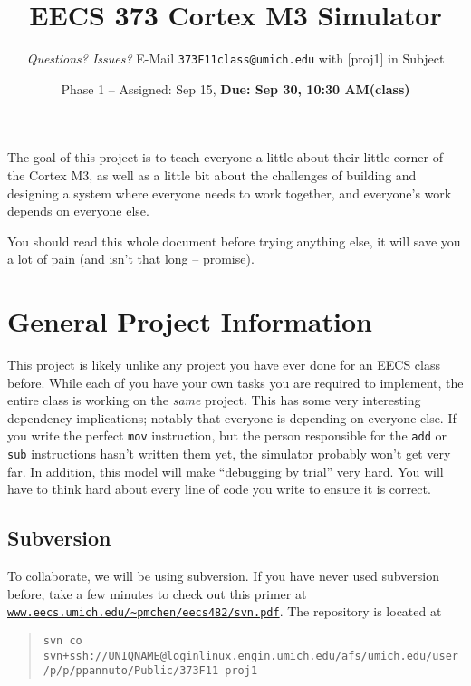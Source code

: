 \documentclass{article}
\begin{document}
\pagestyle{fancyplain}

\def\checkptdate{Sep 23, 10:30 AM}
\def\duedate{Sep 30, 10:30 AM}

\title{EECS 373 Cortex M3 Simulator}
\author{{\em Questions? Issues?} E-Mail {\tt 373F11class@umich.edu} with [proj1]
in Subject}
\date{Phase 1 -- Assigned: Sep 15, {\bf Due: \duedate (class)}}
\maketitle

The goal of this project is to teach everyone a little about their little
corner of the Cortex M3, as well as a little bit about the challenges of
building and designing a system where everyone needs to work together, and
everyone's work depends on everyone else.

You should read this whole document before trying anything else, it will save
you a lot of pain (and isn't that long -- promise).

\section{General Project Information}

This project is likely unlike any project you have ever done for an EECS class
before. While each of you have your own tasks you are required to implement,
the entire class is working on the {\em same} project. This has some very
interesting dependency implications; notably that everyone is depending on
everyone else. If you write the perfect {\tt mov} instruction, but the person
responsible for the {\tt add} or {\tt sub} instructions hasn't written them
yet, the simulator probably won't get very far.
In addition, this model will make ``debugging by trial'' very hard. You will
have to think hard about every line of code you write to ensure it is correct.

\subsection{Subversion}

To collaborate, we will be using subversion. If you have never used subversion
before, take a few minutes to check out this primer at {\tt
\href{http://www.eecs.umich.edu/~pmchen/eecs482/svn.pdf}
{www.eecs.umich.edu/\textasciitilde pmchen/eecs482/svn.pdf}}. The repository is
located at

\begin{quote}
{\tt svn co
svn+ssh://UNIQNAME@loginlinux.engin.umich.edu/afs/umich.edu/user/p/p/ppannuto/Public/373F11~proj1}
\end{quote}
\end{document}
